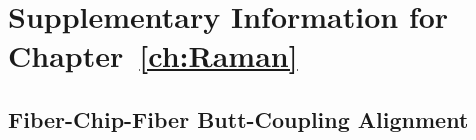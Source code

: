 \chapter{Supplementary Information for Chapter~\ref{ch:Raman}}
\label{appendix: Raman}
\acresetall

\section{Fiber-Chip-Fiber Butt-Coupling Alignment}
